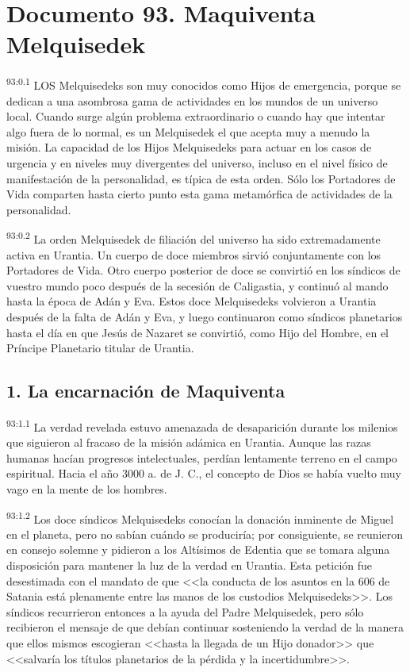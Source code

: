 \chapter{Documento 93. Maquiventa Melquisedek}
\par
\textsuperscript{93:0.1} LOS Melquisedeks son muy conocidos como Hijos de emergencia, porque se dedican a una asombrosa gama de actividades en los mundos de un universo local. Cuando surge algún problema extraordinario o cuando hay que intentar algo fuera de lo normal, es un Melquisedek el que acepta muy a menudo la misión. La capacidad de los Hijos Melquisedeks para actuar en los casos de urgencia y en niveles muy divergentes del universo, incluso en el nivel físico de manifestación de la personalidad, es típica de esta orden. Sólo los Portadores de Vida comparten hasta cierto punto esta gama metamórfica de actividades de la personalidad.

\par
\textsuperscript{93:0.2} La orden Melquisedek de filiación del universo ha sido extremadamente activa en Urantia. Un cuerpo de doce miembros sirvió conjuntamente con los Portadores de Vida. Otro cuerpo posterior de doce se convirtió en los síndicos de vuestro mundo poco después de la secesión de Caligastia, y continuó al mando hasta la época de Adán y Eva. Estos doce Melquisedeks volvieron a Urantia después de la falta de Adán y Eva, y luego continuaron como síndicos planetarios hasta el día en que Jesús de Nazaret se convirtió, como Hijo del Hombre, en el Príncipe Planetario titular de Urantia.

\section*{1. La encarnación de Maquiventa}
\par
\textsuperscript{93:1.1} La verdad revelada estuvo amenazada de desaparición durante los milenios que siguieron al fracaso de la misión adámica en Urantia. Aunque las razas humanas hacían progresos intelectuales, perdían lentamente terreno en el campo espiritual. Hacia el año 3000 a. de J. C., el concepto de Dios se había vuelto muy vago en la mente de los hombres.

\par
\textsuperscript{93:1.2} Los doce síndicos Melquisedeks conocían la donación inminente de Miguel en el planeta, pero no sabían cuándo se produciría; por consiguiente, se reunieron en consejo solemne y pidieron a los Altísimos de Edentia que se tomara alguna disposición para mantener la luz de la verdad en Urantia. Esta petición fue desestimada con el mandato de que <<la conducta de los asuntos en la 606 de Satania está plenamente entre las manos de los custodios Melquisedeks>>. Los síndicos recurrieron entonces a la ayuda del Padre Melquisedek, pero sólo recibieron el mensaje de que debían continuar sosteniendo la verdad de la manera que ellos mismos escogieran <<hasta la llegada de un Hijo donador>> que <<salvaría los títulos planetarios de la pérdida y la incertidumbre>>.

